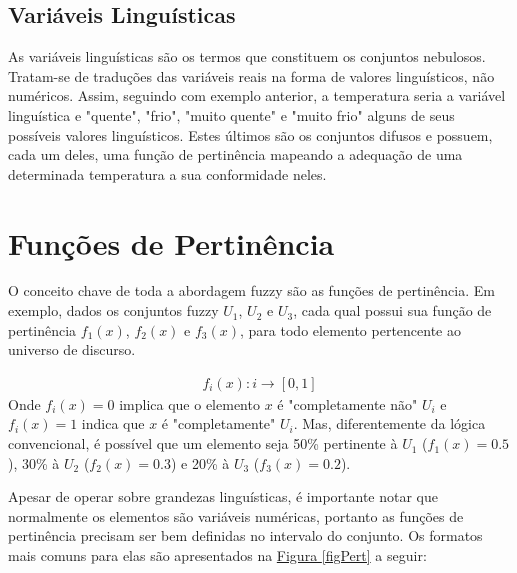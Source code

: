 \subsection{Variáveis Linguísticas}
As variáveis linguísticas são os termos que constituem os conjuntos nebulosos. Tratam-se de traduções das variáveis reais na forma de valores linguísticos, não numéricos. Assim, seguindo com exemplo anterior, a temperatura seria a variável linguística e "quente", "frio", "muito quente" e "muito frio" alguns de seus possíveis valores linguísticos. Estes últimos são os conjuntos difusos e possuem, cada um deles, uma função de pertinência mapeando a adequação de uma determinada temperatura a sua conformidade neles.

\section{Funções de Pertinência}
\label{secFncPert}
O conceito chave de toda a abordagem fuzzy são as funções de pertinência. Em exemplo, dados os conjuntos fuzzy $U_1$, $U_2$ e $U_3$, cada qual possui sua função de pertinência $f_1(x)$, $f_2(x)$ e $f_3(x)$, para todo elemento pertencente ao universo de discurso.

\begin{align}
	f_i(x) : i \rightarrow [0,1]
	\label{eqFuncPertFuzzy}
\end{align}
Onde $f_i(x)=0$ implica que o elemento $x$ é "completamente não" $U_i$ e $f_i(x)=1$ indica que $x$ é "completamente" $U_i$. Mas, diferentemente da lógica convencional, é possível que um elemento seja 50\% pertinente à $U_1$ ($f_1(x)=0.5$), 30\%  à $U_2$ ($f_2(x)=0.3$) e 20\%  à $U_3$ ($f_3(x)=0.2$).

Apesar de operar sobre grandezas linguísticas, é importante notar que normalmente os elementos são variáveis numéricas, portanto as funções de pertinência precisam ser bem definidas no intervalo do conjunto. Os formatos mais comuns para elas são apresentados na \hyperref[figPert]{Figura \ref{figPert}} a seguir:

